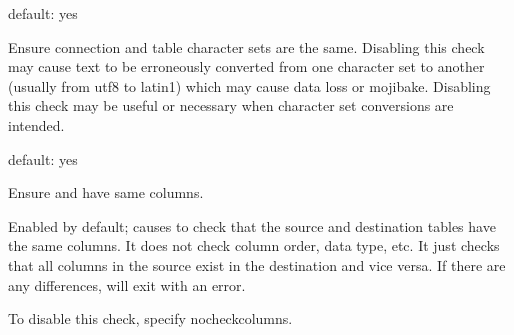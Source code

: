 \documentclass[letterpaper,10pt,english]{sphinxmanual}
\begin{document}

\begin{fulllineitems}
\label{\detokenize{mariadb-archiver:cmdoption-mariadb-archiver-no-check-charset}}
default: yes

Ensure connection and table character sets are the same.  Disabling this check
may cause text to be erroneously converted from one character set to another
(usually from utf8 to latin1) which may cause data loss or mojibake.  Disabling
this check may be useful or necessary when character set conversions are
intended.

\end{fulllineitems}


\begin{fulllineitems}
\label{\detokenize{mariadb-archiver:cmdoption-mariadb-archiver-no-check-columns}}
default: yes

Ensure {\hyperref[\detokenize{mariadb-archiver:cmdoption-mariadb-archiver-source}]{}} and {\hyperref[\detokenize{mariadb-archiver:cmdoption-mariadb-archiver-dest}]{}} have same columns.

Enabled by default; causes  to check that the source and destination
tables have the same columns.  It does not check column order, data type, etc.
It just checks that all columns in the source exist in the destination and
vice versa.  If there are any differences,  will exit with an
error.

To disable this check, specify \textendash{}no\sphinxhyphen{}check\sphinxhyphen{}columns.

\end{fulllineitems}
\end{document}
